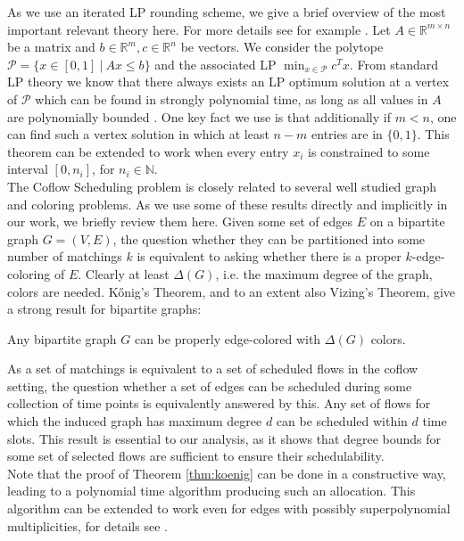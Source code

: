 \documentclass[11pt]{article}
\begin{document}
As we use an iterated LP rounding scheme, we give a brief overview of the most important relevant theory here. For more details see for example \cite{bansal:LIPIcs.FSTTCS.2014.1,schrijver_linprog}. Let $A \in \mathbb{R}^{m \times n}$ be a matrix and $b \in \mathbb{R}^m, c \in \mathbb{R}^n$ be vectors. We consider the polytope $\mathcal{P} = \{x\in [0,1]\ |\ Ax \le b\}$ and the associated LP $\min_{x \in \mathcal{P}} c^Tx$. From standard LP theory we know that there always exists an LP optimum solution at a vertex of $\mathcal{P}$ which can be found in strongly polynomial time, as long as all values in $A$ are polynomially bounded \cite{Tardos1986}. One key fact we use is that additionally if $m < n$, one can find such a vertex solution in which at least $n - m$ entries are in $\{0,1\}$. This theorem can be extended to work when every entry $x_i$ is constrained to some interval $[0,n_i]$, for $n_i \in \mathbb{N}$.\\

The Coflow Scheduling problem is closely related to several well studied graph and coloring problems. As we use some of these results directly and implicitly in our work, we briefly review them here. Given some set of edges $E$ on a bipartite graph $G=(V,E)$, the question whether they can be partitioned into some number of matchings $k$ is equivalent to asking whether there is a proper $k$-edge-coloring of $E$. Clearly at least $\Delta(G)$, i.e. the maximum degree of the graph, colors are needed. Kőnig's Theorem, and to an extent also Vizing's Theorem, give a strong result for bipartite graphs:

\begin{theorem}\label{thm:koenig}
Any bipartite graph $G$ can be properly edge-colored with $\Delta(G)$ colors.
\end{theorem}

As a set of matchings is equivalent to a set of scheduled flows in the coflow setting, the question whether a set of edges can be scheduled during some collection of time points is equivalently answered by this. Any set of flows for which the induced graph has maximum degree $d$ can be scheduled within $d$ time slots. This result is essential to our analysis, as it shows that degree bounds for some set of selected flows are sufficient to ensure their schedulability.\\
Note that the proof of Theorem \ref{thm:koenig} can be done in a constructive way, leading to a polynomial time algorithm producing such an allocation. This algorithm can be extended to work even for edges with possibly superpolynomial multiplicities, for details see \cite{zhen_2015}.
\end{document}
